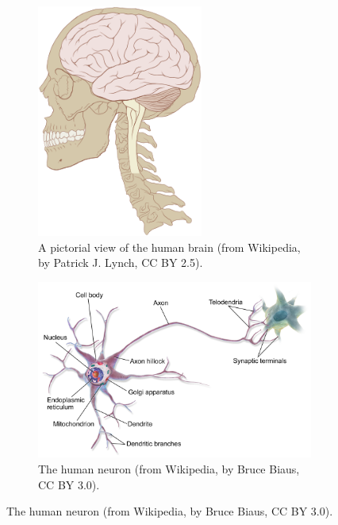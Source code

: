 \begin{figure}[h]
    \centering
    \begin{subfigure}[b]{0.4\textwidth}
    \centering
    \includegraphics[width=0.6\textwidth]{images/humanbrain.png}
    \caption{A pictorial view of the human brain (from Wikipedia, by Patrick J. Lynch, CC BY 2.5).}
    \label{fig:humanbrain}
    \end{subfigure}
    \hfill
        \begin{subfigure}[b]{0.55\textwidth}
        \includegraphics[width=1\textwidth]{images/Blausen_0657_MultipolarNeuron.png}
     \caption{The human neuron (from Wikipedia, by Bruce Biaus, CC BY 3.0).}
     \label{fig:neuron}
        \end{subfigure}

\end{figure}

